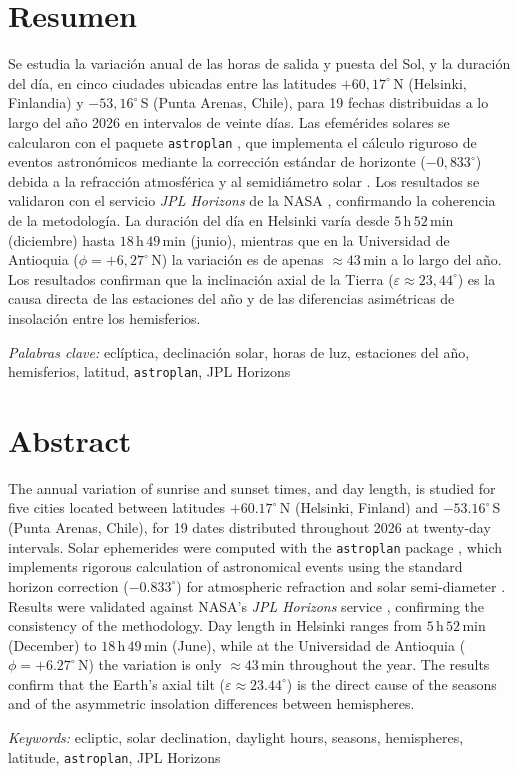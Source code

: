 \markright{\mititulo \hspace{5cm} \thepage}
\pagestyle{fancy}

\section*{Resumen}

\noindent Se estudia la variación anual de las horas de salida y puesta del Sol, y la
duración del día, en cinco ciudades ubicadas entre las latitudes $+60{,}17^\circ$\,N
(Helsinki, Finlandia) y $-53{,}16^\circ$\,S (Punta Arenas, Chile), para 19 fechas
distribuidas a lo largo del año 2026 en intervalos de veinte días.
Las efemérides solares se calcularon con el paquete \texttt{astroplan}
\citep{Morris2018}, que implementa el cálculo riguroso de eventos astronómicos mediante
la corrección estándar de horizonte ($-0{,}833^\circ$) debida a la refracción
atmosférica y al semidiámetro solar \citep{Meeus1998}.
Los resultados se validaron con el servicio \textit{JPL Horizons} de la NASA
\citep{Giorgini1996}, confirmando la coherencia de la metodología.
La duración del día en Helsinki varía desde $5$\,h\,$52$\,min (diciembre) hasta
$18$\,h\,$49$\,min (junio), mientras que en la Universidad de Antioquia
($\phi = +6{,}27^\circ$\,N) la variación es de apenas $\approx 43$\,min a lo largo del
año.
Los resultados confirman que la inclinación axial de la Tierra ($\varepsilon \approx
23{,}44^\circ$) es la causa directa de las estaciones del año y de las diferencias
asimétricas de insolación entre los hemisferios.

\vspace{1cm}\textit{Palabras clave:} eclíptica, declinación solar, horas de luz,
estaciones del año, hemisferios, latitud, \texttt{astroplan}, JPL Horizons

\newpage

\section*{Abstract}

\noindent The annual variation of sunrise and sunset times, and day length, is studied
for five cities located between latitudes $+60.17^\circ$\,N (Helsinki, Finland) and
$-53.16^\circ$\,S (Punta Arenas, Chile), for 19 dates distributed throughout 2026 at
twenty-day intervals.
Solar ephemerides were computed with the \texttt{astroplan} package
\citep{Morris2018}, which implements rigorous calculation of astronomical events using
the standard horizon correction ($-0.833^\circ$) for atmospheric refraction and solar
semi-diameter \citep{Meeus1998}.
Results were validated against NASA's \textit{JPL Horizons} service
\citep{Giorgini1996}, confirming the consistency of the methodology.
Day length in Helsinki ranges from $5$\,h\,$52$\,min (December) to $18$\,h\,$49$\,min
(June), while at the Universidad de Antioquia ($\phi = +6.27^\circ$\,N) the variation
is only $\approx 43$\,min throughout the year.
The results confirm that the Earth's axial tilt ($\varepsilon \approx 23.44^\circ$) is
the direct cause of the seasons and of the asymmetric insolation differences between
hemispheres.

\vspace{1cm}\textit{Keywords:} ecliptic, solar declination, daylight hours, seasons,
hemispheres, latitude, \texttt{astroplan}, JPL Horizons

\newpage
